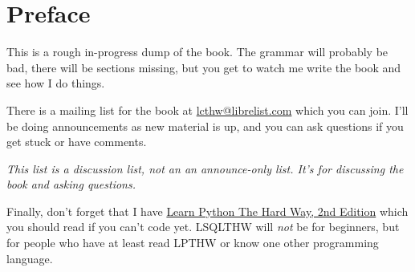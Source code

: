 \chapter*{Preface}

This is a rough in-progress dump of the book.  The grammar will probably be bad, there
will be sections missing, but you get to watch me write the book and see how I do things.

There is a mailing list for the book at
\href{mailto:lcthw@librelist.com}{lcthw@librelist.com} which you can join.
I'll be doing announcements as new material is up, and you can ask questions if
you get stuck or have comments. 

\emph{This list is a discussion list, not an an announce-only list.  It's for discussing the book and asking questions.}

Finally, don't forget that I have \href{http://learnpythonthehardway.org}{Learn
Python The Hard Way, 2nd Edition} which you should read if you can't code yet.
LSQLTHW will \emph{not} be for beginners, but for people who have at least read
LPTHW or know one other programming language.

